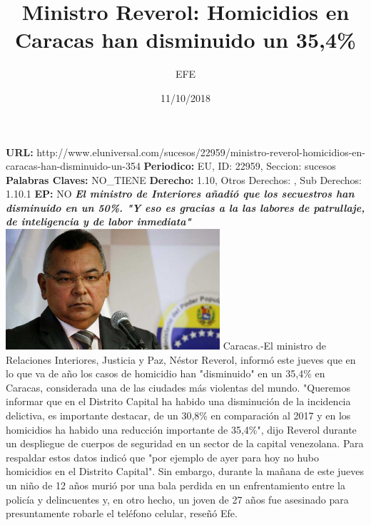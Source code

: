 \documentclass{article}%
\title{\textbf{Ministro Reverol: Homicidios en Caracas han disminuido un 35,4\%}}%
\author{EFE}%
\date{11/10/2018}%
\begin{document}
%
\normalsize%
\maketitle%
\textbf{URL: }%
http://www.eluniversal.com/sucesos/22959/ministro{-}reverol{-}homicidios{-}en{-}caracas{-}han{-}disminuido{-}un{-}354\newline%
%
\textbf{Periodico: }%
EU, %
ID: %
22959, %
Seccion: %
sucesos\newline%
%
\textbf{Palabras Claves: }%
NO\_TIENE\newline%
%
\textbf{Derecho: }%
1.10, %
Otros Derechos: %
, %
Sub Derechos: %
1.10.1\newline%
%
\textbf{EP: }%
NO\newline%
\newline%
%
\textbf{\textit{El ministro de Interiores añadió que los secuestros han disminuido en un 50\%. "Y eso es gracias a la las labores de patrullaje, de inteligencia y de labor inmediata"}}%
\newline%
\newline%
%
\includegraphics[width=300px]{97.jpg}%
\newline%
%
Caracas.{-}El ministro de Relaciones Interiores, Justicia y Paz, Néstor Reverol, informó este jueves que en lo que va de año los casos de homicidio han "disminuido" en un 35,4\% en Caracas, considerada una de las ciudades más violentas del mundo.%
\newline%
%
"Queremos informar que en el Distrito Capital ha habido una disminución de la incidencia delictiva, es importante destacar, de un 30,8\% en comparación al 2017 y en los homicidios ha habido una reducción importante de 35,4\%", dijo Reverol durante un despliegue de cuerpos de seguridad en un sector de la capital venezolana.%
\newline%
%
Para respaldar estos datos indicó que "por ejemplo de ayer para hoy no hubo homicidios en el Distrito Capital". \newline%
\newline%
Sin embargo, durante la mañana de este jueves un niño de 12 años murió por una bala perdida en un enfrentamiento entre la policía y delincuentes y, en otro hecho, un joven de 27 años fue asesinado para presuntamente robarle el teléfono celular, reseñó Efe.%
\end{document}
